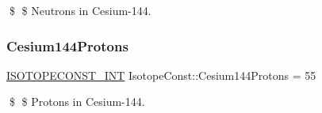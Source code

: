\$ \$ Neutrons in Cesium-\/144. \mbox{\label{group___isotope_const-_cesium-_cs144_ga336eaea34825fe7bd0922b61d59952c4}} 
\subsubsection{\texorpdfstring{Cesium144\+Protons}{Cesium144Protons}}
{\footnotesize\ttfamily \mbox{\hyperlink{group___isotope_const-_macros_ga5f18360b3e99483a35c32d789e62621c}{I\+S\+O\+T\+O\+P\+E\+C\+O\+N\+S\+T\+\_\+\+I\+NT}} Isotope\+Const\+::\+Cesium144\+Protons = 55}

\$ \$ Protons in Cesium-\/144. 